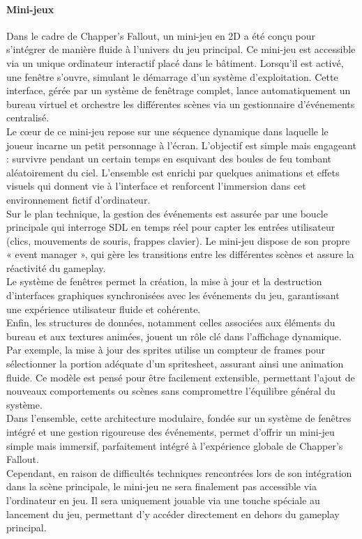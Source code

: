 \paragraph{Mini-jeux}
Dans le cadre de Chapper's Fallout, un mini-jeu en 2D a été conçu pour s’intégrer de manière fluide à l’univers 
du jeu principal. Ce mini-jeu est accessible via un unique ordinateur interactif placé dans le bâtiment. Lorsqu’il 
est activé, une fenêtre s’ouvre, simulant le démarrage d’un système d’exploitation. Cette interface, gérée par un 
système de fenêtrage complet, lance automatiquement un bureau virtuel et orchestre les différentes scènes via un 
gestionnaire d’événements centralisé.
\\
Le cœur de ce mini-jeu repose sur une séquence dynamique dans laquelle le joueur incarne un petit personnage à l’écran. 
L’objectif est simple mais engageant : survivre pendant un certain temps en esquivant des boules de feu tombant aléatoirement 
du ciel. L’ensemble est enrichi par quelques animations et effets visuels qui donnent vie à l’interface et renforcent 
l’immersion dans cet environnement fictif d’ordinateur.
\\
Sur le plan technique, la gestion des événements est assurée par une boucle principale qui interroge SDL en temps réel pour 
capter les entrées utilisateur (clics, mouvements de souris, frappes clavier). Le mini-jeu dispose de son propre « event manager », 
qui gère les transitions entre les différentes scènes et assure la réactivité du gameplay.
\\
Le système de fenêtres permet la création, la mise à jour et la destruction d’interfaces graphiques synchronisées avec les 
événements du jeu, garantissant une expérience utilisateur fluide et cohérente.
\\
Enfin, les structures de données, notamment celles associées aux éléments du bureau et aux textures animées, jouent un rôle clé dans 
l’affichage dynamique. Par exemple, la mise à jour des sprites utilise un compteur de frames pour sélectionner la portion adéquate 
d’un spritesheet, assurant ainsi une animation fluide. Ce modèle est pensé pour être facilement extensible, permettant l’ajout de 
nouveaux comportements ou scènes sans compromettre l’équilibre général du système.
\\
Dans l’ensemble, cette architecture modulaire, fondée sur un système de fenêtres intégré et une gestion rigoureuse des événements, 
permet d’offrir un mini-jeu simple mais immersif, parfaitement intégré à l’expérience globale de Chapper's Fallout.
\\
Cependant, en raison de difficultés techniques rencontrées lors de son intégration dans la scène principale, le mini-jeu ne sera 
finalement pas accessible via l’ordinateur en jeu. Il sera uniquement jouable via une touche spéciale au lancement du jeu, permettant 
d’y accéder directement en dehors du gameplay principal.
\\

